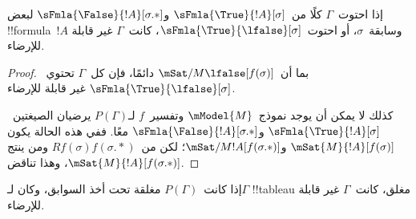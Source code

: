 \documentclass[../../../include/open-logic-section]{subfiles}
\begin{document}
\begin{prop}
  إذا احتوت~$\Gamma$ كلًا من~$\sFmla{\True}{!A}[\sigma]$
  و$\sFmla{\False}{!A}[\sigma.{*}]$ لبعض !!{formula}~$!A$
  وسابقة~$\sigma$، أو احتوت~$\sFmla{\True}{\lfalse}[\sigma]$،
  كانت~$\Gamma$ غير قابلة للإرضاء.
\end{prop}

\begin{proof}
  بما أن~$\mSat/{M}{\lfalse}[f(\sigma)]$ دائمًا، فإن كل~$\Gamma$
  تحتوي~$\sFmla{\True}{\lfalse}[\sigma]$ غير قابلة للإرضاء.

  كذلك لا يمكن أن يوجد نموذج~$\mModel{M}$ وتفسير~$f$ لـ$P(\Gamma)$
  يرضيان الصيغتين~$\sFmla{\True}{!A}[\sigma]$
  و$\sFmla{\False}{!A}[\sigma.{*}]$ معًا. ففي هذه الحالة يكون
  $\mSat{M}{!A}[f(\sigma)]$ و$\mSat/{M}{!A}[f(\sigma.{*})]$؛
  لكن من~$Rf(\sigma)f(\sigma.{*})$ ومن
   ينتج
  $\mSat{M}{!A}[f(\sigma.{*})]$، وهذا تناقض.
\end{proof}

\begin{thm}[السلامة]
  إذا كانت~$P(\Gamma)$ مغلقة تحت أخذ السوابق، وكان لـ$\Gamma$
  !!{tableau} مغلق، كانت~$\Gamma$ غير قابلة للإرضاء.
\end{thm}
\end{document}
